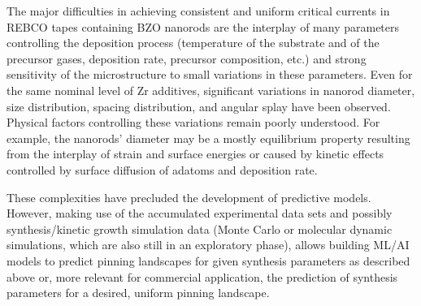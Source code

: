 \documentclass[%
 aip,
 amsmath,amssymb,
 reprint,%
floatfix]{revtex4-1}
\newcommand{\circled}[1]{\tikz[baseline=(char.base)]{\node[shape=circle,draw,fill=lightgray,inner sep=0.7pt] (char) {#1};}}
\begin{document}
The major difficulties in achieving consistent and uniform critical currents in REBCO tapes containing BZO nanorods are the interplay of many parameters controlling the deposition process (temperature of the substrate and of the precursor gases, deposition rate, precursor composition, etc.) and strong sensitivity of the microstructure to small variations in these parameters.  Even for the same nominal level of Zr additives, significant variations in nanorod diameter, size distribution, spacing distribution, and angular splay have been observed. Physical factors controlling these variations remain poorly understood. For example, the nanorods’ diameter may be a mostly equilibrium property resulting from the interplay of strain and surface energies or caused by kinetic effects controlled by surface diffusion of adatoms and deposition rate. 

These complexities have precluded the development of predictive models.  However, making use of the accumulated experimental data sets and possibly synthesis/kinetic growth simulation data (Monte Carlo or molecular dynamic simulations, which are also still in an exploratory phase), allows building ML/AI models to predict pinning landscapes for given synthesis parameters as described above or, more relevant for commercial application, the prediction of synthesis parameters for a desired, uniform pinning landscape.


\end{document}
